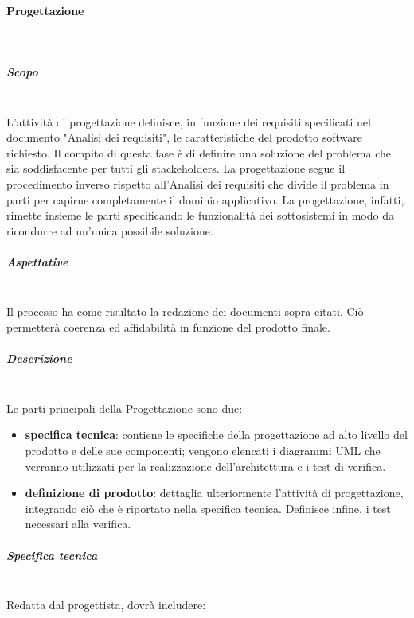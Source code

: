 \paragraph{Progettazione} \mbox{}\\
\subparagraph{Scopo} \mbox{}\\
L'attività di progettazione definisce, in funzione dei requisiti specificati nel documento "Analisi dei requisiti", le caratteristiche del prodotto software richiesto. Il compito di questa fase è di definire una soluzione del problema che sia soddisfacente per tutti gli stackeholders. La progettazione segue il procedimento inverso rispetto all'Analisi dei requisiti che divide il problema in parti per capirne completamente il dominio applicativo. La progettazione, infatti, rimette insieme le parti specificando le funzionalità dei sottosistemi in modo da ricondurre ad un'unica possibile soluzione.
\subparagraph{Aspettative} \mbox{}\\
Il processo ha come risultato la redazione dei documenti sopra citati. Ciò permetterà
coerenza ed affidabilità in funzione del prodotto finale.
\subparagraph{Descrizione} \mbox{}\\
Le parti principali della Progettazione sono due:
\begin{itemize}
	\item \textbf{specifica tecnica}: contiene le specifiche della progettazione ad alto livello del prodotto e delle sue componenti; vengono elencati i diagrammi UML che verranno utilizzati per la realizzazione dell'architettura e i test di verifica.
	\item \textbf{definizione di prodotto}: dettaglia ulteriormente l'attività di progettazione, integrando ciò che è riportato nella specifica tecnica. Definisce infine, i test necessari alla verifica.
\end{itemize}
\subparagraph{Specifica tecnica} \mbox{}\\
Redatta dal progettista, dovrà includere:
